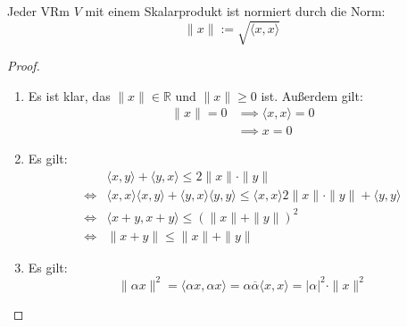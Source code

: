 \documentclass[parskip,a4paper,twoside,DIV15,BCOR12mm]{scrbook}
\begin{document}
\begin{comment}
Im Spezialfall $V=\mathbb{K}^n$ mit dem Standardskalarprodukt $\langle\cdot,\cdot\rangle$
gilt nach der Cauchy-Schwarzschen Ungleichung:
\[|\sum_{i=1}^n \xi_i\cdot\overline{\eta_i}|^2\le (\sum_{i=1}^n |\xi_i|^2)(\sum_{j=1}^n |\eta_j|^2)\]
\end{comment}

\begin{theo}
Jeder VRm $V$ mit einem Skalarprodukt ist normiert durch die Norm:
\[\|x\|:=\sqrt{\langle x,x\rangle}\]
\end{theo}

\begin{proof}
\begin{enumerate}
\item Es ist klar, das $\|x\|\in\mathbb{R}$ und $\|x\|\ge 0$ ist. Außerdem gilt:
\begin{align*}
\|x\|=0 &\implies \langle x,x\rangle =0\\
&\implies x=0
\end{align*}
\item  Es gilt:
\begin{align*}
&\langle x,y\rangle +\langle y,x\rangle\le 2\|x\|\cdot\|y\|\\
\iff &\langle x,x\rangle\langle x,y\rangle +\langle y,x\rangle\langle y,y\rangle
\le \langle x,x\rangle 2\|x\|\cdot\|y\|+\langle y,y\rangle\\
\iff &\langle x+y,x+y\rangle \le (\|x\|+\|y\|)^2\\
\iff &\|x+y\|\le \|x\|+\|y\|
\end{align*}
\item Es gilt:
\[\|\alpha x\|^2=\langle \alpha x,\alpha x\rangle = \alpha\overline\alpha
\langle x,x\rangle = |\alpha|^2\cdot\|x\|^2\]
\end{enumerate}
\end{proof}

\begin{comment}
\index{Parallelogrammgleichung}
\begin{enumerate}
\item Mit Hilfe der Norm lautet die Cauchy-Schwarzsche Ungleichung:
\[|\langle x,y\rangle|\le \|x\|\cdot\|y\|\]
\item Damit eine Norm von einem Skalarprodukt stammt, ist offenbar notwendig,
dass sie die \textbf{Parallelogrammgleichung} erfüllt:
\[\forall x,y\in V: \|x+y\|^2+\|x-y\|^2=2(\|x\|^2+\|y\|^2)\]
Denn falls die Norm $\|\cdot\|$ von einem Skalarprodukt $\langle\cdot,\cdot\rangle$
kommt, gilt:
\begin{align*}
\|x+y\|^2+\|x-y\|^2 &= \langle x+y,x+y\rangle +\langle x-y,x-y\rangle\\
&= \|x\|^2+\langle x,y\rangle +\langle y,x\rangle+\|y\|^2 + 
\|x\|^2-\langle x,y\rangle -\langle y,x\rangle+\|y\|^2\\
&= 2(\|x\|^2+\|y\|^2)
\end{align*}
Tatsächlich kommt eine Norm genau dann von einem Skalarprodukt, wenn sie die
Parallelogrammgleichung erfüllt. Dies wird jedoch ohne Beweis angegeben.
\end{enumerate}
\end{comment}
\end{document}
